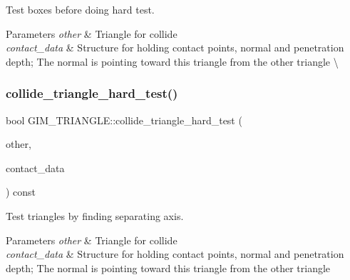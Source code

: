 Test boxes before doing hard test. 


\begin{DoxyParams}{Parameters}
{\em other} & Triangle for collide \\
\hline
{\em contact\+\_\+data} & Structure for holding contact points, normal and penetration depth; The normal is pointing toward this triangle from the other triangle \textbackslash{} \\
\hline
\end{DoxyParams}
\mbox{\label{classGIM__TRIANGLE_a60a6a90dccfd5f81663088847fbfae34}} 
\subsubsection{\texorpdfstring{collide\+\_\+triangle\+\_\+hard\+\_\+test()}{collide\_triangle\_hard\_test()}\hspace{0.1cm}{\footnotesize\ttfamily [1/2]}}
{\footnotesize\ttfamily bool G\+I\+M\+\_\+\+T\+R\+I\+A\+N\+G\+L\+E\+::collide\+\_\+triangle\+\_\+hard\+\_\+test (\begin{DoxyParamCaption}\item[{const \hyperlink{classGIM__TRIANGLE}{G\+I\+M\+\_\+\+T\+R\+I\+A\+N\+G\+LE} \&}]{other,  }\item[{\hyperlink{structGIM__TRIANGLE__CONTACT__DATA}{G\+I\+M\+\_\+\+T\+R\+I\+A\+N\+G\+L\+E\+\_\+\+C\+O\+N\+T\+A\+C\+T\+\_\+\+D\+A\+TA} \&}]{contact\+\_\+data }\end{DoxyParamCaption}) const}



Test triangles by finding separating axis. 


\begin{DoxyParams}{Parameters}
{\em other} & Triangle for collide \\
\hline
{\em contact\+\_\+data} & Structure for holding contact points, normal and penetration depth; The normal is pointing toward this triangle from the other triangle \\
\hline
\end{DoxyParams}
\mbox{\label{classGIM__TRIANGLE_a60a6a90dccfd5f81663088847fbfae34}} 
